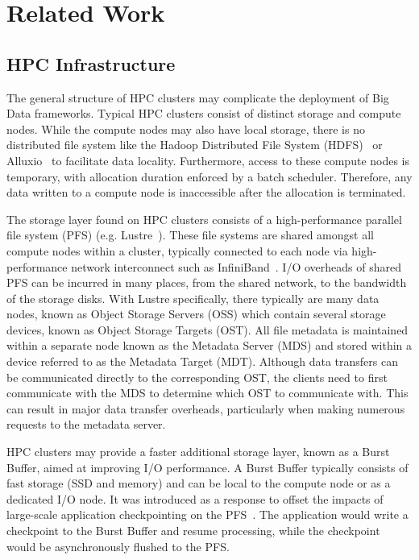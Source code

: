 \documentclass[10pt,journal,compsoc]{IEEEtran}
\begin{document}
\section{Related Work}
\subsection{HPC Infrastructure}
      The general structure of HPC clusters may complicate the deployment of Big
      Data frameworks. Typical HPC clusters consist of distinct storage and
      compute nodes. While the compute nodes may also have local storage, there
      is no distributed file system like the Hadoop Distributed File System
      (HDFS)~\cite{shvachko2010hadoop} or Alluxio~\cite{alluxio} to facilitate
      data locality. Furthermore, access to these compute nodes is temporary,
      with allocation duration enforced by a batch scheduler. Therefore, any
      data written to a compute node is inaccessible after the allocation is
      terminated.

      The storage layer found on HPC clusters consists of a high-performance
      parallel file system (PFS) (e.g. Lustre~\cite{lustre}). These file systems
      are shared amongst all compute nodes within a cluster, typically connected
      to each node via high-performance network interconnect such as
      InfiniBand~\cite{infiniband}. I/O overheads of shared PFS can be incurred
      in many places, from the shared network, to the bandwidth of the storage
      disks.  With Lustre specifically, there typically are many data nodes, known as
      Object Storage Servers (OSS) which contain several storage devices, known
      as Object Storage Targets (OST). All file metadata is maintained within a
      separate node known as the Metadata Server (MDS) and stored within a
      device referred to as the Metadata Target (MDT). Although data transfers
      can be communicated directly to the corresponding OST, the clients need to
      first communicate with the MDS to determine which OST to communicate with.
      This can result in major data transfer overheads, particularly when making
      numerous requests to the metadata server.
      
      
      HPC clusters may provide a faster additional storage layer, known as a
      Burst Buffer, aimed at improving I/O performance. A Burst Buffer typically
      consists of fast storage (SSD and memory) and can be local to the compute
      node or as a dedicated I/O node. It was introduced as a response to offset
      the impacts of large-scale application checkpointing on the PFS~\cite{bb}. The
      application would write a checkpoint to the Burst Buffer and resume
      processing, while the checkpoint would be asynchronously flushed to the
      PFS. 
\end{document}
